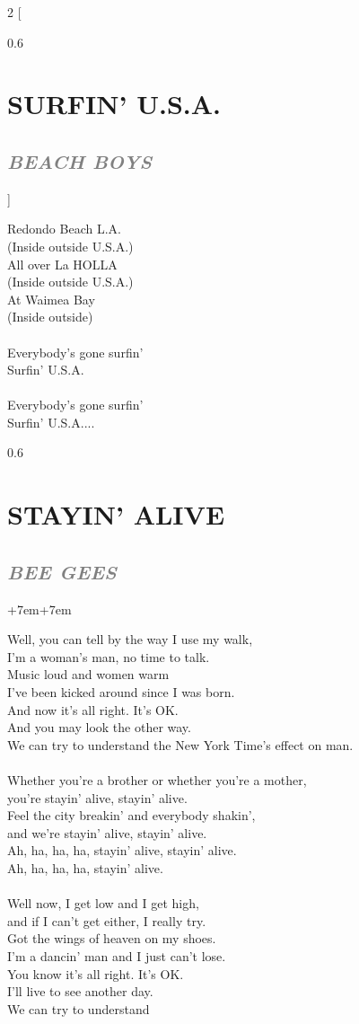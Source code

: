 \documentclass[100pt,a4paper]{report}
\newenvironment{song2}[2]
	{	
    	\begin{multicols*}{2}
		[
			\begin{spacing}{0.6}
				\section*{\LARGE\centering \MakeUppercase{\textbf{{#1}}}}
				\subsection*{\Large\centering \textit{\textcolor{gray}{\MakeUppercase{{#2}}}}}
			\end{spacing}
		]
		\Large
	}
	{
	\end{multicols*}
	\newpage
    }
\newenvironment{song1}[3]
	{
			\begin{spacing}{0.6}
				\section*{\LARGE\centering \MakeUppercase{\textbf{{#1}}}}
				\subsection*{\Large\centering \textit{\textcolor{gray}{\MakeUppercase{{#2}}}}}
			\end{spacing}
			\vspace{0.8cm}
			\begin{adjustwidth}{+7em}{+7em}
			\Large
			
	}
	{
		\end{adjustwidth}
		\newpage
    }
\begin{document}
\begin{song2}{Surfin' U.S.A.}{Beach Boys}
Redondo Beach L.A.\\
(Inside outside U.S.A.)\\
All over La HOLLA\\
(Inside outside U.S.A.)\\
At Waimea Bay\\
(Inside outside)\\
\\
Everybody's gone surfin'\\
Surfin' U.S.A.\\
\\
Everybody's gone surfin'\\
Surfin' U.S.A....
\end{song2}

\begin{song1}{Stayin' alive}{Bee Gees}
\noindent
Well, you can tell by the way I use my walk,\\
I'm a woman's man, no time to talk.\\
Music loud and women warm\\ 
I've been kicked around since I was born.\\
And now it's all right. It's OK.\\
And you may look the other way.\\
We can try to understand the New York Time's effect on man.\\
\\
Whether you're a brother or whether you're a mother,\\
you're stayin' alive, stayin' alive.\\
Feel the city breakin' and everybody shakin',\\
and we're stayin' alive, stayin' alive.\\
Ah, ha, ha, ha, stayin' alive, stayin' alive.\\
Ah, ha, ha, ha, stayin' alive.\\
\\
Well now, I get low and I get high,\\
and if I can't get either, I really try.\\
Got the wings of heaven on my shoes.\\
I'm a dancin' man and I just can't lose.\\
You know it's all right. It's OK.\\
I'll live to see another day.\\
We can try to understand\\

\end{song1}
\end{document}
